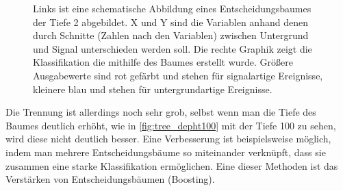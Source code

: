 \begin{figure}[tbp]
\centering     %
{}
\caption{Links ist eine schematische Abbildung eines Entscheidungsbaumes der Tiefe 2 abgebildet. X und Y sind die Variablen anhand denen durch Schnitte (Zahlen nach den Variablen) zwischen Untergrund und Signal unterschieden werden soll. Die rechte Graphik zeigt die Klassifikation die mithilfe des Baumes erstellt wurde. Gr\"o\ss ere Ausgabewerte sind rot gef\"arbt und stehen f\"ur signalartige Ereignisse, kleinere blau und stehen f\"ur untergrundartige Ereignisse.}
\end{figure}

Die Trennung ist allerdings noch sehr grob, selbst wenn man die Tiefe des Baumes deutlich erh\"oht, wie in \ref{fig:tree_depht100} mit der Tiefe 100 zu sehen, wird diese nicht deutlich besser. Eine Verbesserung ist beispielsweise m\"oglich, indem man mehrere Entscheidungsb\"aume so miteinander verkn\"upft, dass sie zusammen eine starke Klassifikation erm\"oglichen. Eine dieser Methoden ist das Verst\"arken von Entscheidungsb\"aumen (Boosting).





